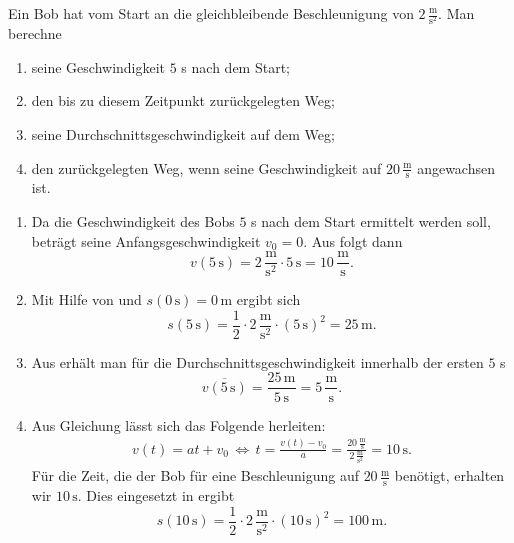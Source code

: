      \begin{MExercises}
     
     \begin{MExercise} 
     Ein Bob hat vom Start an die gleichbleibende Beschleunigung von $2\,\frac{\text{m}}{\text{s}^2}$. Man berechne
     \begin{enumerate}
     \item seine Geschwindigkeit $5$ s nach dem Start;
     \item den bis zu diesem Zeitpunkt zur\"uckgelegten Weg;
     \item seine Durchschnittsgeschwindigkeit auf dem Weg;
     \item den zur\"uckgelegten Weg, wenn seine Geschwindigkeit auf $20 \,\frac{\text{m}}{\text{s}}$ angewachsen ist.
     \end{enumerate} 
     
     \begin{MSolution}
     \begin{enumerate}
     \item Da die Geschwindigkeit des Bobs $5$ s nach dem Start ermittelt werden soll, betr\"agt seine Anfangsgeschwindigkeit $v_0=0$. Aus 
     folgt dann
     \begin{equation*}
     v(5\,\text{s})= 2\,\frac{\text{m}}{\text{s}^2}\cdot 5\,\text{s}=10\,\frac{\text{m}}{\text{s}}.
          \end{equation*}
     \item Mit Hilfe von  und $s(0\,\text{s})=0\,\text{m}$ ergibt sich
     \begin{equation*}
     s(5\,\text{s})=\frac{1}{2}\cdot 2\,\frac{\text{m}}{\text{s}^2}\cdot (5\,\text{s})^2= 25\,\text{m}.
     \end{equation*}
     \item Aus  erh\"alt man f\"ur die Durchschnittsgeschwindigkeit innerhalb der ersten $5$ s
     \begin{equation*}
     \overline{v(5\,\text{s})}=\frac{25\,\text{m}}{5\,\text{s}}=5\,\frac{\text{m}}{\text{s}}.
     \end{equation*}
     \item Aus Gleichung  l\"asst sich das Folgende herleiten:
    \begin{eqnarray*}
     v(t)=a t+v_0\,\Leftrightarrow\, t=\frac{v(t)-v_0}{a}=\frac{20\,\frac{\text{m}}{\text{s}}}{2\,\frac{\text{m}}{\text{s}^2}}=10 \,\text{s}.
     \end{eqnarray*} 
     F\"ur die Zeit, die der Bob f\"ur eine Beschleunigung auf $20\, \frac{\text{m}}{\text{s}}$ ben\"otigt, erhalten wir $10 \,\text{s}$.
     Dies eingesetzt in  ergibt
     \begin{equation*}
     s(10\,\text{s})=\frac{1}{2}\cdot 2\,\frac{\text{m}}{\text{s}^2}\cdot (10\,\text{s})^2=100\,\text{m}.
     \end{equation*}
     \end{enumerate}
     

\end{MSolution}
\end{MExercise}
\end{MExercises}
